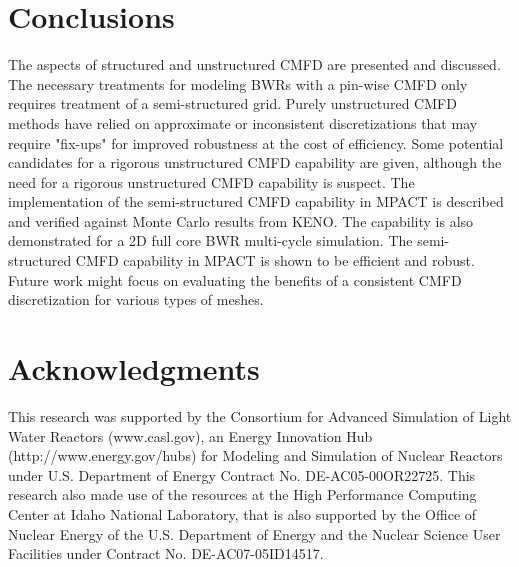 \documentclass{anstrans}
\begin{document}
\section{Conclusions}
The aspects of structured and unstructured CMFD are presented and discussed. The necessary treatments for modeling BWRs with a pin-wise CMFD only requires treatment of a semi-structured grid. Purely unstructured CMFD methods have relied on approximate or inconsistent discretizations that may require "fix-ups" for improved robustness at the cost of efficiency. Some potential candidates for a rigorous unstructured CMFD capability are given, although the need for a rigorous unstructured CMFD capability is suspect.
The implementation of the semi-structured CMFD capability in MPACT is described and verified against Monte Carlo results from KENO. The capability is also demonstrated for a 2D full core BWR multi-cycle simulation. The semi-structured CMFD capability in MPACT is shown to be efficient and robust. Future work might focus on evaluating the benefits of a consistent CMFD discretization for various types of meshes.

\section{Acknowledgments}
This research was supported by the Consortium for Advanced Simulation of Light Water Reactors (www.casl.gov), an Energy Innovation Hub (http://www.energy.gov/hubs) for Modeling and Simulation of Nuclear Reactors under U.S. Department of Energy Contract No. DE-AC05-00OR22725. This research also made use of the resources at the High Performance Computing Center at Idaho National Laboratory, that is also supported by the Office of Nuclear Energy of the U.S. Department of Energy and the Nuclear Science User Facilities under Contract No. DE-AC07-05ID14517.



\end{document}

